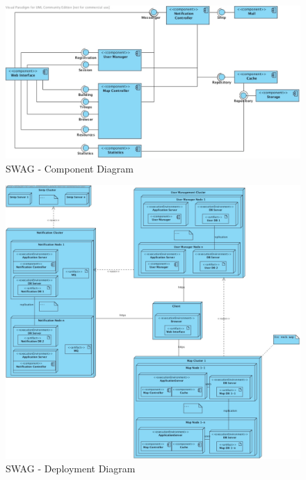 \documentclass[11pt]{article}
\begin{document}
\begin{figure}[h]
\center
\includegraphics[scale=0.5]{diagrams/SWAG_Component_Diagram.pdf}
\caption{SWAG - Component Diagram}
\label{fig:component}
\end{figure}

\begin{figure}[h]
\hspace{-2.3cm}
\includegraphics[scale=0.45]{diagrams/SWAG_Deployment_Diagram.pdf}
\caption{SWAG - Deployment Diagram}
\label{fig:deployment}
\end{figure}

 
\end{document}
